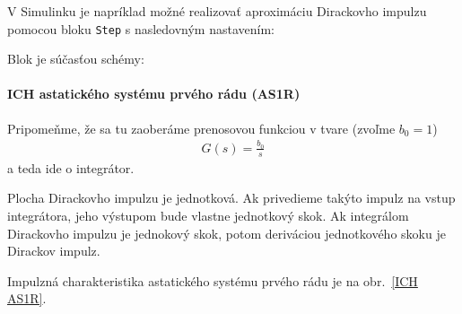 \documentclass[a4paper, 10pt, ]{article}
\begin{document}
V Simulinku je napríklad možné realizovať aproximáciu Dirackovho impulzu pomocou bloku \lstinline|Step| s nasledovným nastavením:
\begin{center}


	\label{stepSetup_DiracApprox.png}

\end{center}

Blok je súčasťou schémy:
\begin{center}


    \vspace{-5mm}

	\label{sim_ICHSS1R}

    \vspace{-1mm}

\end{center}

\paragraph{ICH astatického systému prvého rádu (AS1R)}

Pripomeňme, že sa tu zaoberáme prenosovou funkciou v tvare (zvoľme $b_0 = 1$)
\begin{align} \label{typ1radtf5}
    G(s) = \frac{b_0}{s}
\end{align}
a teda ide o integrátor.

Plocha Dirackovho impulzu je jednotková. Ak privedieme takýto impulz na vstup integrátora, jeho výstupom bude vlastne jednotkový skok. Ak integrálom Dirackovho impulzu je jednokový skok, potom deriváciou jednotkového skoku je Dirackov impulz.


Impulzná charakteristika astatického systému prvého rádu je na obr.~\ref{ICH AS1R}.

\begin{center}


	\label{ICH AS1R}

\end{center}
\end{document}
